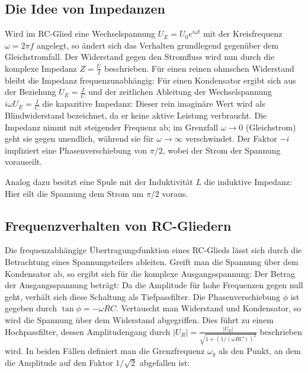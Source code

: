 \subsection{Die Idee von Impedanzen}
Wird im RC-Glied eine Wechselspannung $U_E = U_0 e^{i\omega t}$ mit der Kreisfrequenz $\omega = 2\pi f$ angelegt, so ändert sich das Verhalten grundlegend gegenüber dem Gleichstromfall. Der Widerstand gegen den Stromfluss wird nun durch die komplexe Impedanz $Z = \frac{U}{I}$ beschrieben. Für einen reinen ohmschen Widerstand bleibt die Impedanz frequenzunabhängig:
Für einen Kondensator ergibt sich aus der Beziehung $\dot{U}_E = \frac{I}{C}$ und der zeitlichen Ableitung der Wechselspannung $i\omega U_E = \frac{I}{C}$ die kapazitive Impedanz:
Dieser rein imaginäre Wert wird als Blindwiderstand bezeichnet, da er keine aktive Leistung verbraucht. Die Impedanz nimmt mit steigender Frequenz ab; im Grenzfall $\omega \to 0$ (Gleichstrom) geht sie gegen unendlich, während sie für $\omega \to \infty$ verschwindet. Der Faktor $-i$ impliziert eine Phasenverschiebung von $\pi/2$, wobei der Strom der Spannung vorauseilt.


Analog dazu besitzt eine Spule mit der Induktivität $L$ die induktive Impedanz:
Hier eilt die Spannung dem Strom um $\pi/2$ voraus.

\subsection{Frequenzverhalten von RC-Gliedern}
Die frequenzabhängige Übertragungsfunktion eines RC-Glieds lässt sich durch die Betrachtung eines Spannungsteilers ableiten. Greift man die Spannung über dem Kondensator ab, so ergibt sich für die komplexe Ausgangsspannung:
Der Betrag der Ausgangsspannung beträgt:
Da die Amplitude für hohe Frequenzen gegen null geht, verhält sich diese Schaltung als Tiefpassfilter. Die Phasenverschiebung $\phi$ ist gegeben durch $\tan \phi = -\omega RC$.
Vertauscht man Widerstand und Kondensator, so wird die Spannung über dem Widerstand abgegriffen. Dies führt zu einem Hochpassfilter, dessen Amplitudengang durch $|U_R| = \frac{|U_E|}{\sqrt{1 + (1/(\omega RC))^2}}$ beschrieben wird. In beiden Fällen definiert man die Grenzfrequenz $\omega_g$ als den Punkt, an dem die Amplitude auf den Faktor $1/\sqrt{2}$ abgefallen ist:

